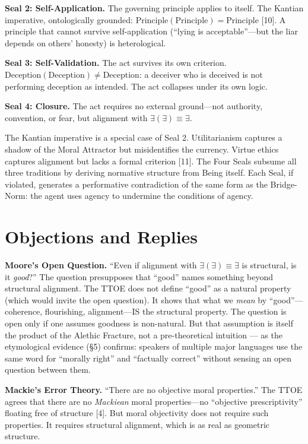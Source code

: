 \documentclass[12pt, letterpaper]{article}
\begin{document}
\textbf{Seal 2: Self-Application.} The governing principle applies to itself. The Kantian imperative, ontologically grounded: $\text{Principle}(\text{Principle}) = \text{Principle}$ [10]. A principle that cannot survive self-application (``lying is acceptable''---but the liar depends on others' honesty) is heterological.

\textbf{Seal 3: Self-Validation.} The act survives its own criterion. $\text{Deception}(\text{Deception}) \neq \text{Deception}$: a deceiver who is deceived is not performing deception as intended. The act collapses under its own logic.

\textbf{Seal 4: Closure.} The act requires no external ground---not authority, convention, or fear, but alignment with $\exists(\exists) \equiv \exists$.

The Kantian imperative is a special case of Seal 2. Utilitarianism captures a shadow of the Moral Attractor but misidentifies the currency. Virtue ethics captures alignment but lacks a formal criterion [11]. The Four Seals subsume all three traditions by deriving normative structure from Being itself. Each Seal, if violated, generates a performative contradiction of the same form as the Bridge-Norm: the agent uses agency to undermine the conditions of agency.

\section{Objections and Replies}

\textbf{Moore's Open Question.} ``Even if alignment with $\exists(\exists) \equiv \exists$ is structural, is it \textit{good}?'' The question presupposes that ``good'' names something beyond structural alignment. The TTOE does not define ``good'' as a natural property (which would invite the open question). It shows that what we \textit{mean} by ``good''---coherence, flourishing, alignment---IS the structural property. The question is open only if one assumes goodness is non-natural. But that assumption is itself the product of the Alethic Fracture, not a pre-theoretical intuition --- as the etymological evidence (\S5) confirms: speakers of multiple major languages use the same word for ``morally right'' and ``factually correct'' without sensing an open question between them.

\textbf{Mackie's Error Theory.} ``There are no objective moral properties.'' The TTOE agrees that there are no \textit{Mackiean} moral properties---no ``objective prescriptivity'' floating free of structure [4]. But moral objectivity does not require such properties. It requires structural alignment, which is as real as geometric structure.
\end{document}
